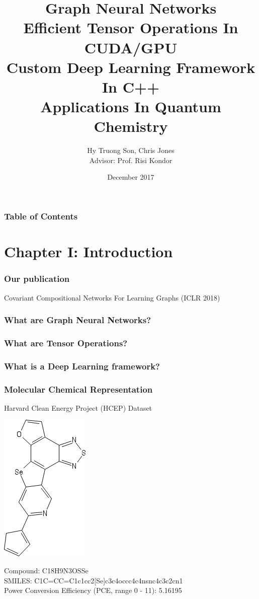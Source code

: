 \documentclass{beamer}
\title[Graph Neural Networks]{Graph Neural Networks \\ Efficient Tensor Operations In CUDA/GPU \\ Custom Deep Learning Framework In C++ \\ Applications In Quantum Chemistry}
\author[Hy et al.]{Hy Truong Son, Chris Jones \\ Advisor: Prof. Risi Kondor}
\institute[UChicago]{The University of Chicago}
\date{December 2017}
\begin{document}

\frame{\titlepage}

\begin{frame}
\frametitle{Table of Contents}
\tableofcontents
\end{frame}

\section{Chapter I: Introduction}

\begin{frame}
\frametitle{Our publication}
Covariant Compositional Networks For Learning Graphs (ICLR 2018)
\end{frame}

\begin{frame}
\frametitle{What are Graph Neural Networks?}
\end{frame}

\begin{frame}
\frametitle{What are Tensor Operations?}
\end{frame}

\begin{frame}
\frametitle{What is a Deep Learning framework?}
\end{frame}

\begin{frame}
\frametitle{Molecular Chemical Representation}
\begin{justify}
\begin{center}
	Harvard Clean Energy Project (HCEP) Dataset \cite{Johannes}
\end{center}
\begin{center}
	\includegraphics[scale=0.5]{sketcher}
\end{center}
Compound: C18H9N3OSSe \\
SMILES: C1C=CC=C1c1cc2[Se]c3c4occc4c4nsnc4c3c2cn1 \\
Power Conversion Efficiency (PCE, range 0 - 11): 5.16195
\end{justify}
\end{frame}
\end{document}
